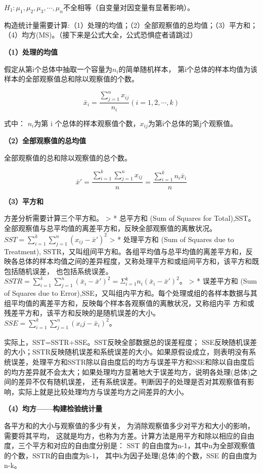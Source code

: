 \documentclass[]{ctexbook}
\begin{document}
\(H_1:\mu_1,\mu_2,\mu_3,\cdots,\mu_n\)不全相等（自变量对因变量有显著影响）。

构造统计量需要计算:（1）处理的均值；（2）全部观察值的总均值；（3）平方和；（4）均方(MS)。（接下来是公式大全，公式恐惧症者请跳过）

\textbf{（1）处理的均值}

假定从第i个总体中抽取一个容量为\(n_i\)的简单随机样本， 第i个总体的样本均值为该样本的全部观察值总和除以观察值的个数。

\[\bar x_i=\frac{\sum_{j=1}^nx_{ij}}{n_i} (i=1,2,\cdots,k)\]

式中： \(n_i\)为第 i 个总体的样本观察值个数，\(x_{ij}\)为第i个总体的第j个观察值。

\textbf{（2）全部观察值的总均值}

全部观察值的总和除以观察值的总个数。

\[\bar x'=\frac{\sum_{i=1}^k\sum_{j=1}^nx_{ij}}{n}=\frac{\sum_{i=1}^kn_i\bar x_i}{n}\]

\textbf{（3）平方和}

方差分析需要计算三个平方和。
\textgreater{} * 总平方和 (Sum of Squares for Total),SST。全部观察值与总平均值的离差平方和，反映全部观察值的离散状况。\(SST=\sum_{i=1}^k\sum_{j=1}^n(x_{ij}-\bar x')^2\)
\textgreater{} * 处理平方和 (Sum of Squares due to Treatment), SSTR，又叫组间平方和。各组平均值与总平均值的离差平方和，反映各总体的样本均值之间的差异程度，又称处理平方和或组间平方和，该平方和既包括随机误差， 也包括系统误差。\(SSTR= \sum_{i=1}^k\sum_{j=1}^n(\bar x_i-\bar x')^2=\Sigma_{i=1}^kn_i(\bar x_i-\bar x')^2\)。
\textgreater{} * 误差平方和 (Sum of Squares due to Error),SSE，又叫组内平方和。每个处理或组的各样本数据与其组平均值的离差平方和，反映每个样本各观察值的离散状况，又称组内平
方和或残差平方和，该平方和反映的是随机误差的大小。\(SSE=\sum_{i=1}^k\sum_{j=1}^n(x_ij-\bar x_i)^2\)。

实际上，SST=SSTR+SSE。SST反映全部数据总的误差程度； SSE反映随机误差的大小；SSTR反映随机误差和系统误差的大小。如果原假设成立，则表明没有系统误差，处理平方和SSTR除以自由度后的均方与误差平方和SSE和除以自由度后的均方差异就不会太大；如果处理均方显著地大于误差均方，说明各处理(总体)之间的差异不仅有随机误差， 还有系统误差。判断因子的处理是否对其观察值有影响，实际上就是比较处理均方与误差均方之间差异的大小。

\textbf{（4）均方------构建检验统计量}

各平方和的大小与观察值的多少有关， 为消除观察值多少对平方和大小的影响， 需要将其平均， 这就是均方，也称为方差。计算方法是用平方和除以相应的自由度，三个平方和对应的自由度分别是： SST 的自由度为n-1，其中n为全部观察值的个数，SSTR的自由度为k-1， 其中k为因子处理(总体)的个数，SSE 的自由度为n-k。
\end{document}
